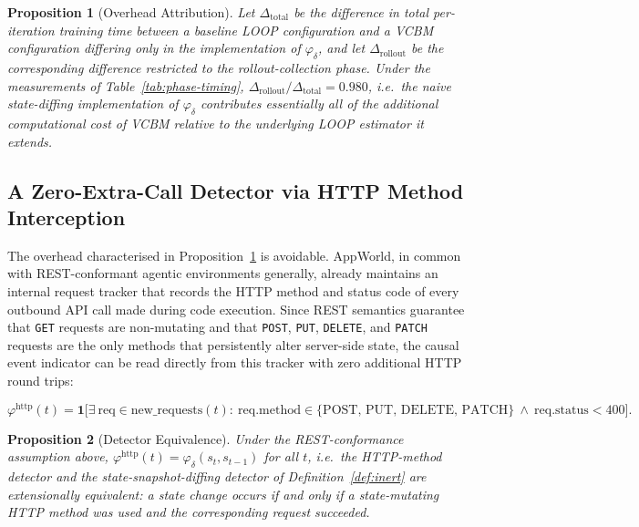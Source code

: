 \documentclass[11pt]{article}
\newtheorem{proposition}{Proposition}
\begin{document}
\begin{proposition}[Overhead Attribution]
\label{prop:overhead}
Let $\Delta_{\mathrm{total}}$ be the difference in total per-iteration
training time between a baseline LOOP configuration and a VCBM configuration
differing only in the implementation of $\varphi_\delta$, and let
$\Delta_{\mathrm{rollout}}$ be the corresponding difference restricted to the
rollout-collection phase. Under the measurements of
Table~\ref{tab:phase-timing}, $\Delta_{\mathrm{rollout}} / \Delta_{\mathrm{total}} = 0.980$,
i.e.\ the naive state-diffing implementation of $\varphi_\delta$ contributes
essentially all of the additional computational cost of VCBM relative to the
underlying LOOP estimator it extends.
\end{proposition}

\subsection{A Zero-Extra-Call Detector via HTTP Method Interception}
\label{sec:http-detector}

The overhead characterised in Proposition~\ref{prop:overhead} is avoidable.
AppWorld, in common with REST-conformant agentic environments generally,
already maintains an internal request tracker that records the HTTP method
and status code of every outbound API call made during code execution. Since
REST semantics guarantee that \texttt{GET} requests are non-mutating and that
\texttt{POST}, \texttt{PUT}, \texttt{DELETE}, and \texttt{PATCH} requests are
the only methods that persistently alter server-side state, the causal event
indicator can be read directly from this tracker with zero additional HTTP
round trips:

\begin{equation}
\varphi^{\mathrm{http}}(t) = \mathbf{1}\Big[\exists\ \mathrm{req} \in
\mathrm{new\_requests}(t) :\ \mathrm{req.method} \in \{\mathrm{POST,\,PUT,\,DELETE,\,PATCH}\}
\ \wedge\ \mathrm{req.status} < 400\Big].
\end{equation}

\begin{proposition}[Detector Equivalence]
\label{prop:equivalence}
Under the REST-conformance assumption above, $\varphi^{\mathrm{http}}(t) =
\varphi_\delta(s_t, s_{t-1})$ for all $t$, i.e.\ the HTTP-method detector and
the state-snapshot-diffing detector of Definition~\ref{def:inert} are
extensionally equivalent: a state change occurs if and only if a
state-mutating HTTP method was used and the corresponding request succeeded.
\end{proposition}
\end{document}
